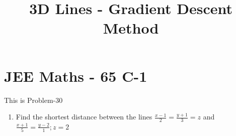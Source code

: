 \documentclass[12pt]{article}
\begin{document}
\begin{center}
\title{\textbf{3D Lines - Gradient Descent Method}}
\date{\vspace{-5ex}} %
\maketitle
\end{center}
\setcounter{page}{1}

\section{JEE Maths - 65 C-1}
This is Problem-30 
\begin{enumerate}
\item Find the shortest distance between the lines $\frac{x-1}{2} = \frac{y+1}{3}=z$ and $\frac{x+1}{5} = \frac{y-2}{1}; z=2 $ 


\end{enumerate}
\end{document}
